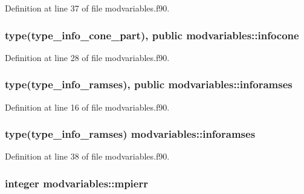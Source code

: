 Definition at line 37 of file modvariables.\-f90.

\hypertarget{classmodvariables_a48325a5fd368cb5c42b94981c0b2fb51}{
\subsubsection[{infocone}]{\setlength{\rightskip}{0pt plus 5cm}type(type\-\_\-info\-\_\-cone\-\_\-part), public modvariables\-::infocone}}\label{classmodvariables_a48325a5fd368cb5c42b94981c0b2fb51}


Definition at line 28 of file modvariables.\-f90.

\hypertarget{classmodvariables_a7d9b154c81790b61636ec708d445b14c}{
\subsubsection[{inforamses}]{\setlength{\rightskip}{0pt plus 5cm}type(type\-\_\-info\-\_\-ramses), public modvariables\-::inforamses}}\label{classmodvariables_a7d9b154c81790b61636ec708d445b14c}


Definition at line 16 of file modvariables.\-f90.

\hypertarget{classmodvariables_ac5c429dcac062e12390685db02e3ae8a}{
\subsubsection[{inforamses}]{\setlength{\rightskip}{0pt plus 5cm}type(type\-\_\-info\-\_\-ramses) modvariables\-::inforamses}}\label{classmodvariables_ac5c429dcac062e12390685db02e3ae8a}


Definition at line 38 of file modvariables.\-f90.

\hypertarget{classmodvariables_ab580e2bdf8eff875402911526f873de2}{
\subsubsection[{mpierr}]{\setlength{\rightskip}{0pt plus 5cm}integer modvariables\-::mpierr}}\label{classmodvariables_ab580e2bdf8eff875402911526f873de2}


